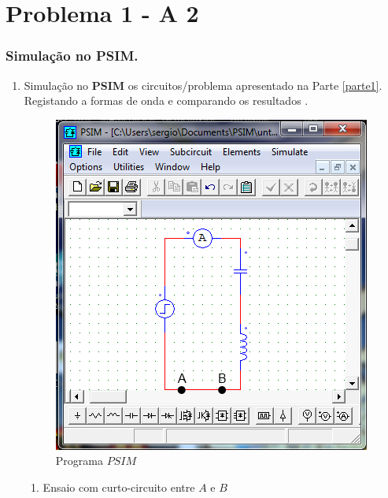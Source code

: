 \documentclass[titlepage, a4paper, 11pt, reqno, openany]{report}
\begin{document}
\part{Problema 1 - A 2}
\section{Simula\c{c}\~{a}o  no {\bf PSIM}.}
\begin{enumerate}
\item
Simula\c{c}\~{a}o  no {\bf PSIM} os circuitos/problema  apresentado  na Parte \ref{parte1}. Registando  a formas  de onda  e comparando  os resultados .\par
%
\begin{figure}[H]
\centering
\includegraphics[scale=1.3]{./image/PSIM_0.png}
\caption{Programa $PSIM$}
\label{figura 5}
\end{figure}\par
%
\begin{enumerate}
\item
Ensaio  com curto-circuito  entre $A$ e $B$\par
%
\begin{figure}[H]
\centering

\end{figure}
\end{enumerate}
\end{enumerate}
\end{document}
